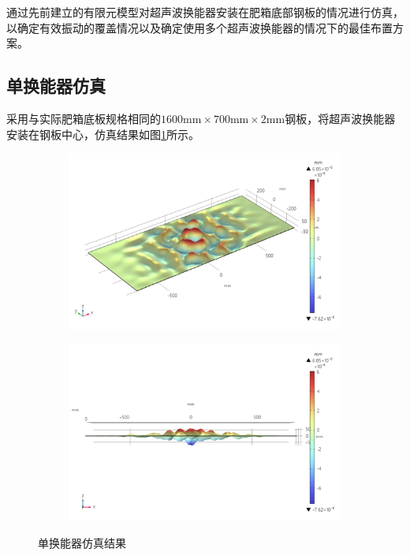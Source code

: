 \documentclass[fontset=windows,12pt,a4paper,titlepage,UTF8]{ctexart}
\begin{document}
通过先前建立的有限元模型对超声波换能器安装在肥箱底部钢板的情况进行仿真，以确定有效振动的覆盖情况以及确定使用多个超声波换能器的情况下的最佳布置方案。

\subsection{单换能器仿真}

采用与实际肥箱底板规格相同的$1600 \mathrm{mm} \times 700 \mathrm{mm} \times 2 \mathrm{mm}$钢板，将超声波换能器安装在钢板中心，仿真结果如图\ref{pic:单换能器仿真结果}所示。

\begin{figure}[h]
  \centering
  \begin{subfigure}{0.45\textwidth}
    \centering
    \includegraphics[width=\textwidth]{assets/result_1600x700_proper_focus.png}
  \end{subfigure}
  \hfill
  \begin{subfigure}{0.45\textwidth}
    \centering
    \includegraphics[width=\textwidth]{assets/result_1600x700_side_focus.png}
  \end{subfigure}
  \caption{单换能器仿真结果}
  \label{pic:单换能器仿真结果}
\end{figure}
\end{document}
